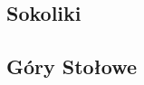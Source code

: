 \documentclass{article}
\begin{document}
\subsection{Sokoliki}

\subsection{Góry Stołowe}

\pagebreak
\nocite{*}
\printbibliography
\end{document}
